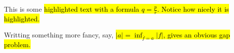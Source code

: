 \documentclass[a8paper, landscape]{scrartcl}
\begin{document}
\setlength{\lineskip}{0pt}

This is some \hl{highlighted text with a formula $q=\frac{p}{r}$.
Notice how nicely it is highlighted.}

Writting something more fancy, say, \hl{$|a|=\inf_{\overline{f}=a}|f|$,
gives an obvious gap problem.}
\end{document}
